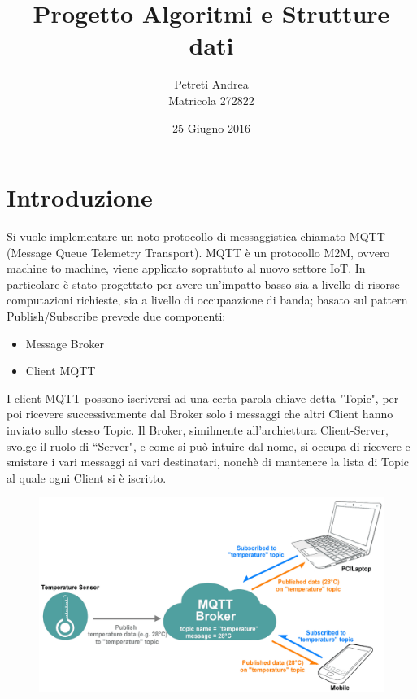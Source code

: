 \documentclass{article}
\title{Progetto Algoritmi e Strutture dati}
\author{Petreti Andrea\\\small Matricola 272822}
\date{25 Giugno 2016}
\begin{document}
\maketitle
\thispagestyle{empty}

\newpage 

\renewcommand{\contentsname}{Indice}

\tableofcontents

\newpage

\section{Introduzione}
Si vuole implementare un noto protocollo di messaggistica chiamato MQTT (Message Queue Telemetry Transport). MQTT è un protocollo M2M, ovvero machine to machine, viene applicato soprattuto al nuovo settore IoT. In particolare è stato progettato per avere un'impatto basso sia a livello di risorse computazioni richieste, sia a livello di occupaazione di banda; basato sul pattern Publish/Subscribe prevede due componenti:
\begin{itemize}
	\item Message Broker
	\item Client MQTT
\end{itemize}
I client MQTT possono iscriversi ad una certa parola chiave detta "Topic", per poi ricevere successivamente dal Broker solo i messaggi che altri Client hanno inviato sullo stesso Topic. Il Broker, similmente all'archiettura Client-Server, svolge il ruolo di ``Server", e come si può intuire dal nome, si occupa di ricevere e smistare i vari messaggi ai vari destinatari, nonchè di mantenere la lista di Topic al quale ogni Client si è iscritto.

\begin{figure}[htbp]
	\centerline{
		\includegraphics[scale=0.2]{immagini/broker_client_img.png}
	}
\end{figure}
\end{document}
